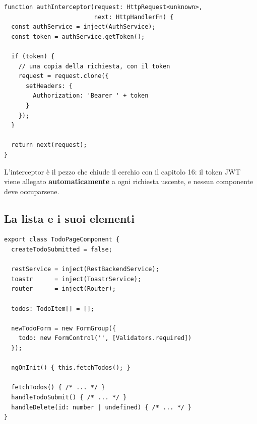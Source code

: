 \begin{affianco}[0.5][c]
\codicepiccolo
\begin{lstlisting}[style=ts, name=auth.interceptor.ts]
function authInterceptor(request: HttpRequest<unknown>,
                         next: HttpHandlerFn) {
  const authService = inject(AuthService);
  const token = authService.getToken();

  if (token) {
    // una copia della richiesta, con il token
    request = request.clone({
      setHeaders: {
        Authorization: 'Bearer ' + token
      }
    });
  }

  return next(request);
}
\end{lstlisting}
\risultato
\begin{immagine}
\end{immagine}
\end{affianco}

L'interceptor è il pezzo che chiude il cerchio con il capitolo 16: il token JWT
viene allegato \textbf{automaticamente} a ogni richiesta uscente, e nessun
componente deve occuparsene.

\subsection{La lista e i suoi elementi}

\begin{lstlisting}[style=ts, name=todo-page.component.ts]
export class TodoPageComponent {
  createTodoSubmitted = false;

  restService = inject(RestBackendService);
  toastr      = inject(ToastrService);
  router      = inject(Router);

  todos: TodoItem[] = [];

  newTodoForm = new FormGroup({
    todo: new FormControl('', [Validators.required])
  });

  ngOnInit() { this.fetchTodos(); }

  fetchTodos() { /* ... */ }
  handleTodoSubmit() { /* ... */ }
  handleDelete(id: number | undefined) { /* ... */ }
}
\end{lstlisting}

